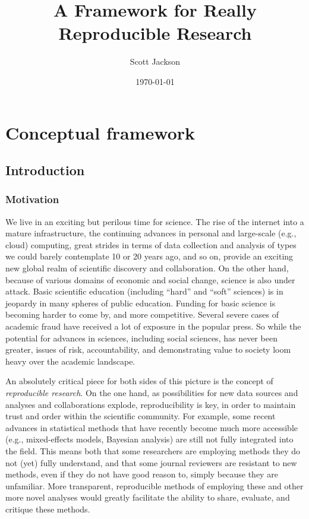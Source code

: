 \documentclass[11pt]{book}
\title{A Framework for Really Reproducible Research}
\author{Scott Jackson}
\date{\today}
\begin{document}
\maketitle

\setcounter{tocdepth}{3}
\tableofcontents
\vspace*{1cm}

\part{Conceptual framework}
\label{sec-1}
\chapter{Introduction}
\label{sec-1-1}
\section{Motivation}
\label{sec-1-1-1}

We live in an exciting but perilous time for science. The rise of the internet into a mature infrastructure, the continuing advances in personal and large-scale (e.g., cloud) computing, great strides in terms of data collection and analysis of types we could barely contemplate 10 or 20 years ago, and so on, provide an exciting new global realm of scientific discovery and collaboration. On the other hand, because of various domains of economic and social change, science is also under attack.  Basic scientific education (including ``hard'' and ``soft'' sciences) is in jeopardy in many spheres of public education.  Funding for basic science is becoming harder to come by, and more competitive.  Several severe cases of academic fraud have received a lot of exposure in the popular press. So while the potential for advances in sciences, including social sciences, has never been greater, issues of risk, accountability, and demonstrating value to society loom heavy over the academic landscape.

An absolutely critical piece for both sides of this picture is the concept of \emph{reproducible research}.  On the one hand, as possibilities for new data sources and analyses and collaborations explode, reproducibility is key, in order to maintain trust and order within the scientific community.  For example, some recent advances in statistical methods that have recently become much more accessible (e.g., mixed-effects models, Bayesian analysis) are still not fully integrated into the field.  This means both that some researchers are employing methods they do not (yet) fully understand, and that some journal reviewers are resistant to new methods, even if they do not have good reason to, simply because they are unfamiliar. More transparent, reproducible methods of employing these and other more novel analyses would greatly facilitate the ability to share, evaluate, and critique these methods.
\end{document}

